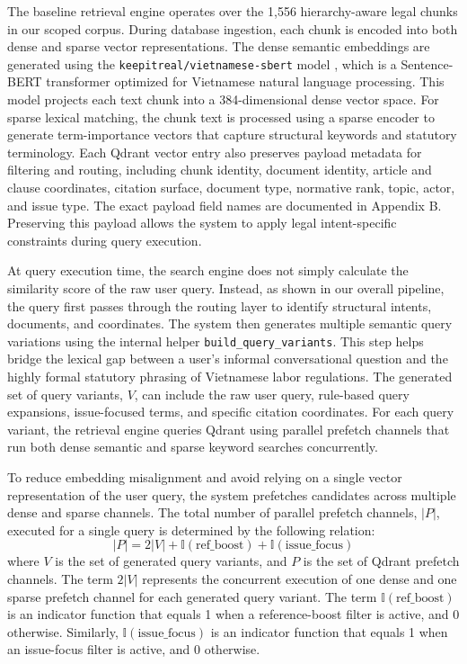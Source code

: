 The baseline retrieval engine operates over the 1,556 hierarchy-aware legal chunks in our scoped corpus. During database ingestion, each chunk is encoded into both dense and sparse vector representations. The dense semantic embeddings are generated using the \texttt{keepitreal/vietnamese-sbert} model \cite{reimers2019sentencebert,keepitreal_vietnamese_sbert}, which is a Sentence-BERT transformer optimized for Vietnamese natural language processing. This model projects each text chunk into a 384-dimensional dense vector space. For sparse lexical matching, the chunk text is processed using a sparse encoder to generate term-importance vectors that capture structural keywords and statutory terminology. Each Qdrant vector entry also preserves payload metadata for filtering and routing, including chunk identity, document identity, article and clause coordinates, citation surface, document type, normative rank, topic, actor, and issue type. The exact payload field names are documented in Appendix B. Preserving this payload allows the system to apply legal intent-specific constraints during query execution.

At query execution time, the search engine does not simply calculate the similarity score of the raw user query. Instead, as shown in our overall pipeline, the query first passes through the routing layer to identify structural intents, documents, and coordinates. The system then generates multiple semantic query variations using the internal helper \texttt{build\_query\_variants}. This step helps bridge the lexical gap between a user's informal conversational question and the highly formal statutory phrasing of Vietnamese labor regulations. The generated set of query variants, $V$, can include the raw user query, rule-based query expansions, issue-focused terms, and specific citation coordinates. For each query variant, the retrieval engine queries Qdrant using parallel prefetch channels that run both dense semantic and sparse keyword searches concurrently.

To reduce embedding misalignment and avoid relying on a single vector representation of the user query, the system prefetches candidates across multiple dense and sparse channels. The total number of parallel prefetch channels, $|P|$, executed for a single query is determined by the following relation:
\[
|P| = 2|V| +
\mathbb{I}(\text{ref\_boost}) +
\mathbb{I}(\text{issue\_focus})
\]
where $V$ is the set of generated query variants, and $P$ is the set of Qdrant prefetch channels. The term $2|V|$ represents the concurrent execution of one dense and one sparse prefetch channel for each generated query variant. The term $\mathbb{I}(\text{ref\_boost})$ is an indicator function that equals 1 when a reference-boost filter is active, and 0 otherwise. Similarly, $\mathbb{I}(\text{issue\_focus})$ is an indicator function that equals 1 when an issue-focus filter is active, and 0 otherwise.

